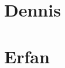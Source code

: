 \documentclass[onecolumn,twoside]{IEEEtran}
\begin{document}
\section{Dennis}

\section{Erfan}



\end{document}
